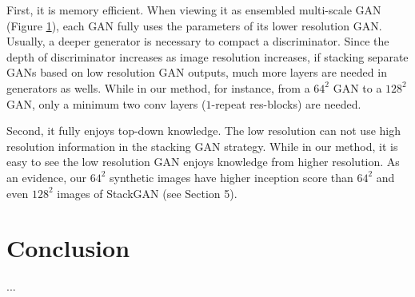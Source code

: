 \documentclass[10pt,twocolumn,letterpaper]{article}
\begin{document}
First, it is memory efficient. 
When viewing it as ensembled multi-scale GAN (Figure \ref{}), each GAN fully uses the parameters of its lower resolution GAN. Usually, a deeper generator is necessary to compact a discriminator. Since the depth of discriminator increases as image resolution increases, if stacking separate GANs based on low resolution GAN outputs, much more layers are needed in generators as wells. While in our method, for instance, from a $64^2$ GAN to a $128^2$ GAN, only a minimum two conv layers ($1$-repeat res-blocks) are needed. 

Second, it fully enjoys top-down knowledge. 
The low resolution can not use high resolution information in the stacking GAN strategy. While in our method, it is easy to see the low resolution GAN enjoys knowledge from higher resolution. As an evidence, our $64^2$ synthetic images have higher inception score than $64^2$ and even $128^2$ images of StackGAN (see Section 5).


\section{Conclusion}
...

{\small


}
\end{document}
